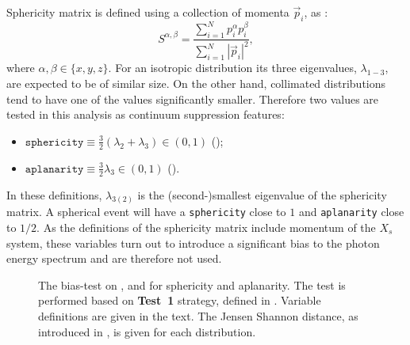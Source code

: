 Sphericity matrix is defined using a collection of momenta $\vec{p}_i$, as \cite{BaBar:2014omp}:
\begin{equation}
    S^{\alpha,\beta} = \frac{\sum^N_{i=1}p_i^{\alpha}p_i^{\beta}}{\sum^N_{i=1}|\vec{p}_i|^2},
\end{equation}
where $\alpha,\beta\in\{x,y,z\}$.
For an isotropic distribution its three eigenvalues, $\lambda_{1-3}$, are expected to be of similar size.
On the other hand, collimated distributions tend to have one of the values significantly smaller.
Therefore two values are tested in this analysis as continuum suppression features:
\begin{itemize}
    \item $\mathtt{sphericity}\equiv\frac{3}{2}(\lambda_2+\lambda_3)\in(0,1)$ ();
    \item $\mathtt{aplanarity}\equiv\frac{3}{2}\lambda_3\in(0,1)$ ().
\end{itemize}
In these definitions, $\lambda_{3(2)}$ is the (second-)smallest eigenvalue of the sphericity matrix.
A spherical event will have a \texttt{sphericity} close to $1$ and \texttt{aplanarity} close to $1/2$.
As the definitions of the sphericity matrix include momentum of the $X_s$ system, these variables turn out to introduce a significant bias to the photon energy spectrum and are therefore not used.

\begin{figure}[htbp!]
    \caption{\label{fig:sphericity_aplanarity} The bias-test on \EB, \Estar and \Mbc for sphericity and aplanarity.
    The test is performed based on \textbf{Test~1} strategy, defined in .
    Variable definitions are given in the text.
    The Jensen Shannon distance, as introduced in , is given for each distribution.
    }
\end{figure}